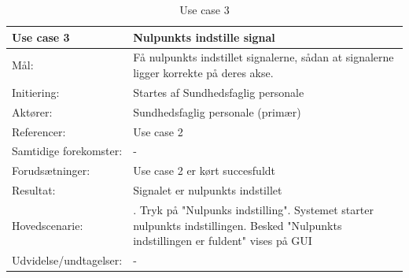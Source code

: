 \begin{table}[H]
\caption{Use case 3}\label{tab:tabel3}
\begin{tabular}{| l | >{\raggedright\arraybackslash}p{11cm} |}
   \hline
   \textbf{Use case 3} & \textbf{Nulpunkts indstille signal}\\ \hline
   Mål: & Få nulpunkts indstillet signalerne, sådan at signalerne ligger korrekte på deres akse. \\ \hline
   Initiering: & Startes af Sundhedsfaglig personale\\ \hline
   Aktører:& Sundhedsfaglig personale (primær)\\ \hline
   Referencer: & Use case 2\\ \hline
   Samtidige forekomster: & -  \\\hline
   Forudsætninger: & Use case 2 er kørt succesfuldt\\ \hline
   Resultat:& Signalet er nulpunkts indstillet\\ \hline
   Hovedscenarie:& 
1. Tryk på "Nulpunks indstilling"\newline
2. Systemet starter nulpunkts indstillingen\newline
3. Besked "Nulpunkts indstillingen er fuldent" vises på GUI\\\hline
Udvidelse/undtagelser: & - \\\hline
\end{tabular}
\end{table}

